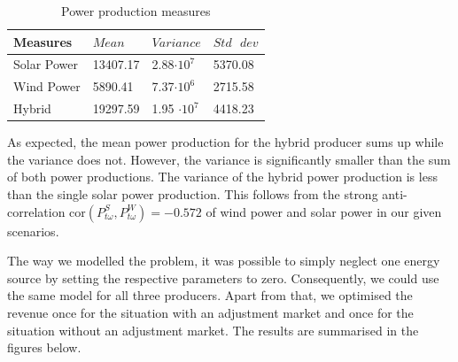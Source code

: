 \begin{table}[h!]
	\centering
	\begin{threeparttable}
		\caption{Power production measures}
		\begin{tabular}{llll}
			\toprule
			Measures & \( Mean \) & \( Variance \) & \( Std \text{ } dev \)  \\
			\midrule
			Solar Power    & 13407.17        &  2.88$\cdot 10^7$      &  5370.08     	    \\
			Wind Power    & 5890.41     &   7.37$\cdot 10^6$      &  2715.58          	\\
			Hybrid    &  19297.59        &  1.95 $\cdot 10^7$    & 4418.23     	\\
			\bottomrule
		\end{tabular}
		
	\end{threeparttable}
\end{table}

As expected, the mean power production for the hybrid producer sums up while the variance does not. However, the variance is significantly smaller than the sum of both power productions. The variance of the hybrid power production is less than the single solar power production. This follows from the strong anti-correlation $ \text{cor} (P_{t\omega}^S,P_{t\omega}^W ) = -0.572 $ of wind power and solar power in our given scenarios.  





The way we modelled the problem, it was possible to simply neglect one energy source by setting the respective parameters to zero. Consequently, we could use the same model for all three producers. Apart from that, we optimised the revenue once for the situation with an adjustment market and once for the situation without an adjustment market. The results are summarised in the figures below.  

